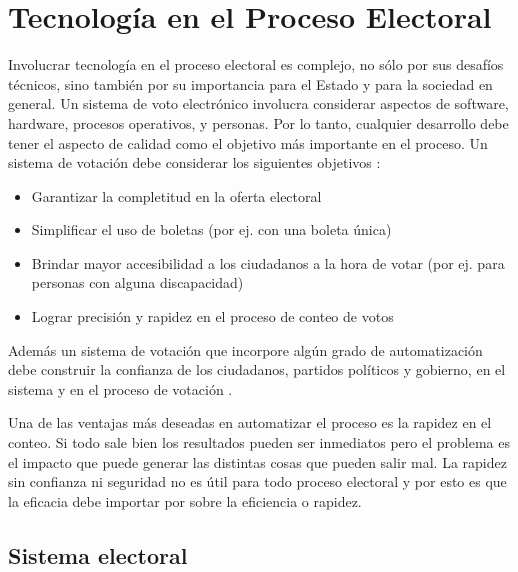 \chapter{Tecnología en el Proceso Electoral}
\label{SistemaElectoral}

Involucrar tecnología en el proceso electoral es complejo, no sólo por sus desafíos técnicos, sino también por su importancia para el Estado y para la sociedad en general. Un sistema de voto electrónico involucra considerar aspectos de software, hardware, procesos operativos, y personas. Por lo tanto, cualquier desarrollo debe tener el aspecto de calidad como el objetivo más importante en el proceso.\newline
Un sistema de votación debe considerar los siguientes objetivos \cite{conicet}:
\begin{itemize}
    \item Garantizar la completitud en la oferta electoral
    \item Simplificar el uso de boletas (por ej. con una boleta única)
    \item Brindar mayor accesibilidad a los ciudadanos a la hora de votar (por ej. para personas con alguna discapacidad)
    \item Lograr precisión y rapidez en el proceso de conteo de votos
\end{itemize}
Además un sistema de votación que incorpore algún grado de automatización debe construir la confianza de los ciudadanos, partidos políticos y gobierno, en el sistema y en el proceso de votación \cite{conicet}.

Una de las ventajas más deseadas en automatizar el proceso es la rapidez en el conteo. Si todo sale bien los resultados pueden ser inmediatos pero el problema es el impacto que puede generar las distintas cosas que pueden salir mal. La rapidez sin confianza ni seguridad no es útil para todo proceso electoral y por esto es que la eficacia debe importar por sobre la eficiencia o rapidez.

\section{Sistema electoral}

